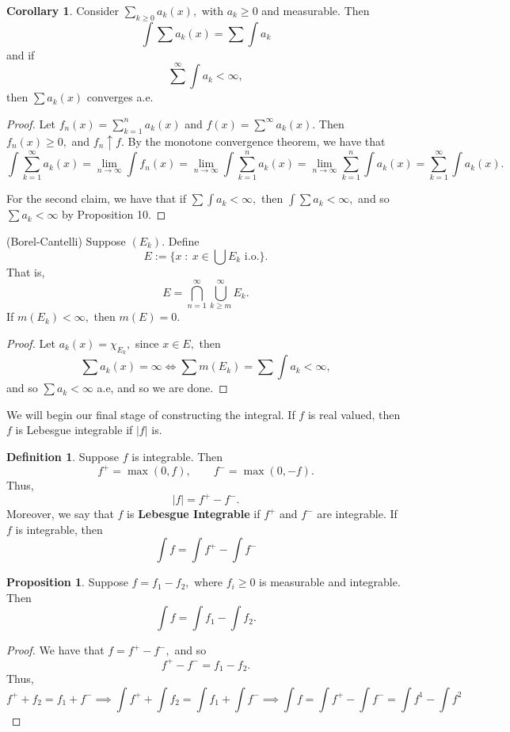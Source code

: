 \documentclass[10pt, oneside]{article}
\theoremstyle{definition}
\newtheorem{defn}{Definition}
\newtheorem{prop}{Proposition}
\newtheorem{cor}{Corollary}
\begin{document}
\begin{cor}
    Consider $\sum_{k\geq 0} a_k(x),$ with $a_k \geq 0$ and measurable. Then 
    \[\int \sum a_k(x) = \sum \int a_k\] and 
    if 
    \[\sum^\infty \int a_k < \infty,\] then $\sum a_k(x)$ converges a.e.
\end{cor}
\begin{proof}
    Let $f_n(x) = \sum_{k=1}^n a_k(x)$ and $f(x) = \sum^\infty a_k(x).$ Then $f_n(x)\geq 0,$ and $f_n \uparrow f.$ By the monotone convergence theorem, we have that 
    \[\int\sum_{k=1}^\infty a_k(x) = \lim_{n\to \infty}\int f_n(x) = \lim_{n\to \infty}\int \sum_{k=1}^n a_k(x) = \lim_{n\to \infty}\sum_{k=1}^n \int a_k(x) = \sum_{k=1}^\infty \int a_k(x).\] 

    For the second claim, we have that if $\sum \int a_k < \infty,$ then $\int \sum a_k < \infty,$ and so $\sum a_k < \infty$ by Proposition 10.
\end{proof}

\begin{lemma}
    (Borel-Cantelli) Suppose $(E_k).$ Define 
    \[E := \{x \; : \: x\in \bigcup E_k \text{ i.o.}\}.\] That is, 
    \[E = \bigcap_{n=1}^\infty \bigcup_{k\geq m}^\infty E_k.\] If $m(E_k)< \infty,$ then $m(E) = 0.$
\end{lemma}
\begin{proof}
    Let $a_k(x) = \chi_{E_k},$ since $x\in E,$ then 
    \[\sum a_k(x) = \infty \iff \sum m(E_k) = \sum \int a_k < \infty,\] and so $\sum a_k < \infty$ a.e, and so we are done.
\end{proof}

We will begin our final stage of constructing the integral. If $f$ is real valued, then $f$ is Lebesgue integrable if $|f|$ is.

\begin{defn}
    Suppose $f$ is integrable. Then 
    \[f^+ = \max(0, f), \qquad f^- = \max (0, -f).\] Thus, 
    \[|f|= f^+ - f^-.\] Moreover, we say that $f$ is \textbf{Lebesgue Integrable} if $f^+$ and $f^-$ are integrable. If $f$ is integrable, then 
    \[\int f = \int f^+ - \int f^-\]
\end{defn}
\begin{prop}
    Suppose $f = f_1 - f_2,$ where $f_i \geq 0$ is measurable and integrable. Then 
    \[\int f = \int f_1 - \int f_2.\]
\end{prop}
\begin{proof}
    We have that $f = f^+ - f^-,$ and so 
    \[f^+ - f^- = f_1 - f_2.\] Thus, 
    \[f^+ + f_2 = f_1 + f^- \implies \int f^+ + \int f_2 = \int f_1 + \int f^- \implies \int f = \int f^+ - \int f^- = \int f^1 - \int f^2\]
\end{proof}
\end{document}
